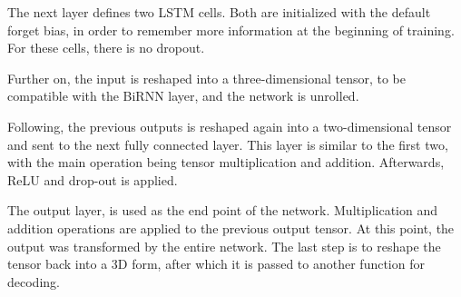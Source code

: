 
The next layer defines two LSTM cells. Both are initialized with the default forget bias, in order to remember more information at the beginning of training. For these cells, there is no dropout.

Further on, the input is reshaped into a three-dimensional tensor, to be compatible with the BiRNN layer, and the network is unrolled. 

Following, the previous outputs is reshaped again into a two-dimensional tensor and sent to the next fully connected layer. 
This layer is similar to the first two, with the main operation being tensor multiplication and addition.
Afterwards, ReLU and drop-out is applied.

The output layer, is used as the end point of the network.
Multiplication and addition operations are applied to the previous output tensor. 
At this point, the output was transformed by the entire network. 
The last step is to reshape the tensor back into a 3D form, after which it is passed to another function for decoding.
